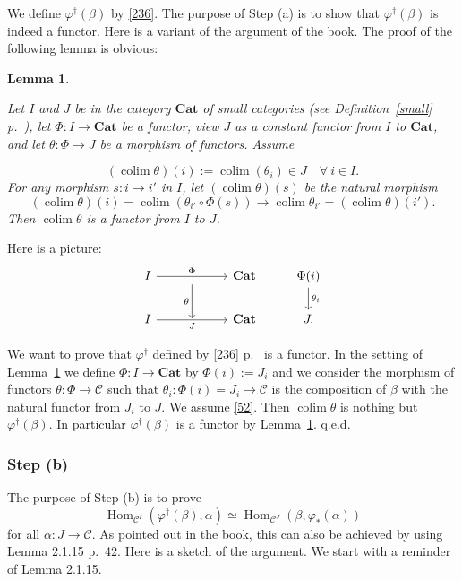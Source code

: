 \documentclass[12pt]{article}%
\newtheorem{lem}[thm]{Lemma}
\theoremstyle{remark}
\theoremstyle{definition}
\newcommand{\C}{\mathcal C}
\newcommand{\Cat}{\mathbf{Cat}}%
\newcommand{\pp}{\varphi}
\DeclareMathOperator*{\colim}{colim}%
\DeclareMathOperator{\Hom}{Hom}%
\begin{document}
We define $\pp^\dagger(\beta)$ by \eqref{236}. The purpose of Step (a) is to show that $\pp^\dagger(\beta)$ is indeed a functor. Here is a variant of the argument of the book. The proof of the following lemma is obvious: 

\begin{lem}\label{r52}

Let $I$ and $J$ be in the category $\Cat$ of small categories (see Definition~\ref{small} p.~\pageref{small}), let $\Phi:I\to\Cat$ be a functor, view $J$ as a constant functor from $I$ to $\Cat$, and let $\theta:\Phi\to J$ be a morphism of functors. Assume 

\begin{equation}\label{52} 
(\colim\theta)(i):=\colim(\theta_i)\in J\quad\forall\ i\in I. 
\end{equation} 
%
For any morphism $s:i\to i'$ in $I$, let $(\colim\theta)(s)$ be the natural morphism 
$$
(\colim\theta)(i)=\colim(\theta_{i'}\circ\Phi(s))\to
\colim\theta_{i'}=(\colim\theta)(i'). 
$$ 
Then $\colim\theta$ is a functor from $I$ to $J$. 
%
\end{lem}
%
Here is a picture:
$$
\begin{tikzcd}
I\ar{rr}{\Phi}&\ar{d}[swap]{\theta}&\Cat&\Phi(i)\ar{d}{\theta_i}\\ 
I\ar{rr}[swap]{J}&{}&\Cat&J.
\end{tikzcd}
$$

We want to prove that $\pp^\dagger$ defined by \eqref{236} p.~\pageref{236} is a functor. In the setting of Lemma~\ref{r52} we define $\Phi:I\to\Cat$ by $\Phi(i):=J_i$ and we consider the morphism of functors $\theta:\Phi\to\C$ such that $\theta_i:\Phi(i)=J_i\to\C$ is the composition of $\beta$ with the natural functor from $J_i$ to $J$. We assume \eqref{52}. Then $\colim\theta$ is nothing but $\pp^\dagger(\beta)$. In particular $\pp^\dagger(\beta)$ is a functor by Lemma~\ref{r52}. q.e.d.

%

\subsubsection{Step (b)}

The purpose of Step (b) is to prove 
\begin{equation}\label{stepb}
\Hom_{\C^I}(\pp^\dagger(\beta),\alpha)\simeq\Hom_{\C^J}(\beta,\pp_*(\alpha)) 
\end{equation} 
for all $\alpha:J\to\C$. As pointed out in the book, this can also be achieved by using Lemma 2.1.15 p.~42. Here is a sketch of the argument. We start with a reminder of Lemma 2.1.15. 
\end{document}
